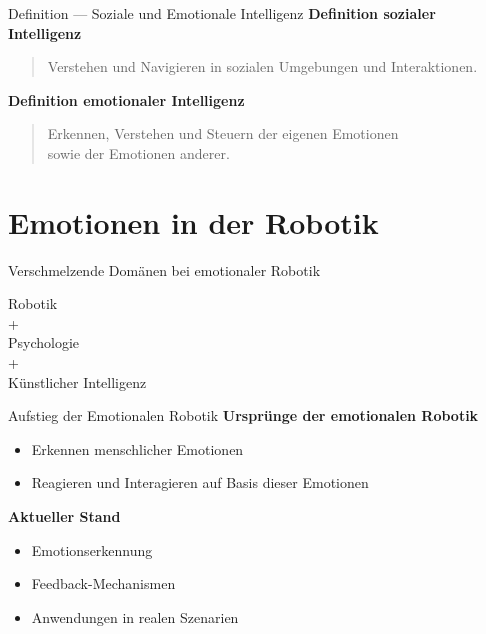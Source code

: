 \documentclass[aspectratio=169]{beamer}
\begin{document}
\begin{frame}{Definition --- Soziale und Emotionale Intelligenz}
  \textbf{Definition sozialer Intelligenz}
  \begin{quote}
    Verstehen und Navigieren in sozialen Umgebungen und Interaktionen.
  \end{quote}
  \vspace{1cm}

  \textbf{Definition emotionaler Intelligenz}
  \begin{quote}
    Erkennen, Verstehen und Steuern der eigenen Emotionen\\
    sowie der Emotionen anderer.
  \end{quote}
\end{frame}

\section{Emotionen in der Robotik}
\begin{frame}{Verschmelzende Domänen bei emotionaler Robotik}
  \begin{center}
    Robotik\\
    +\\
    Psychologie\\
    +\\
    Künstlicher Intelligenz
  \end{center}
\end{frame}

\begin{frame}{Aufstieg der Emotionalen Robotik}
  \textbf{Ursprünge der emotionalen Robotik}
  \begin{itemize}
    \item Erkennen menschlicher Emotionen
    \item Reagieren und Interagieren auf Basis dieser Emotionen
  \end{itemize}

  \textbf{Aktueller Stand}
  \begin{itemize}
    \item Emotionserkennung
    \item Feedback-Mechanismen
    \item Anwendungen in realen Szenarien
  \end{itemize}
\end{frame}
\end{document}
